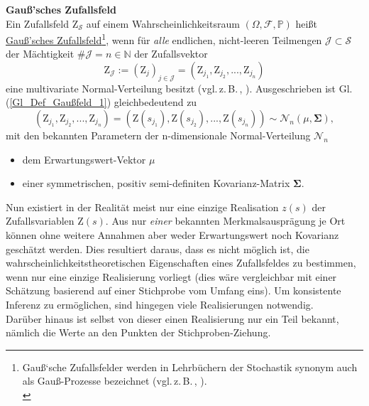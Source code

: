 \begin{definition} \textbf{Gauß'sches Zufallsfeld} \\
Ein Zufallsfeld  
$\mathrm{Z}_\mathcal{S}$ auf 
einem Wahrscheinlichkeitsraum $(\Omega, \mathcal{F}, \mathbb{P})$ heißt
\underline{Gauß'sches Zufallsfeld}\footnote{Gauß`sche Zufallsfelder werden 
in Lehrbüchern der Stochastik synonym auch als Gauß-Prozesse bezeichnet 
(vgl.\,z.\,B.\,\cite[S.\,462]{Schmidt2011}, 
\cite[S.\,344]{Meintrup2005}).\\}, 
wenn für \textit{alle} endlichen, 
nicht-leeren Teilmengen $\mathcal{J} \subset \mathcal{S}$ der Mächtigkeit 
$\#\mathcal{J} = n \in \mathbb{N}$ der Zufallsvektor 
\begin{equation}
\label{Gl_Def_Gaußfeld_1}
\mathrm{Z}_\mathcal{J} :=\left( \mathrm{Z}_j\right)_{j \in \mathcal{J}}=
\left(\mathrm{Z}_{j_1}, \mathrm{Z}_{j_2}, ..., \mathrm{Z}_{j_n}\right) 
\end{equation}
eine multivariate Normal-Verteilung besitzt 
(vgl.\,z.\,B.\,\cite[S.\,46f]{Diggle2007}, \cite[S.\,13]{Montero2015}).
Ausgeschrieben ist Gl.\,(\ref{Gl_Def_Gaußfeld_1}) gleichbedeutend zu
\begin{equation}
\label{Gl_Def_Gaußfeld_2}
\left(\mathrm{Z}_{j_1}, \mathrm{Z}_{j_2}, ..., \mathrm{Z}_{j_n}\right) =
\left(\mathrm{Z}(s_{j_1}), \mathrm{Z}(s_{j_2}), ..., 
\mathrm{Z}(s_{j_n})\right) \sim
\mathcal{N}_n\left(\mu, \mathbf{\Sigma}\right),
\end{equation}
mit den bekannten Parametern der n-dimensionale Normal-Verteilung
$\mathcal{N}_n$
\begin{itemize}[topsep=2pt,parsep=1pt,itemsep=0.5pt]
\item[$\circ$] dem Erwartungswert-Vektor $\mu$
\item[$\circ$] einer symmetrischen, positiv semi-definiten 
Kovarianz-Matrix $\mathbf{\Sigma}$.
\end{itemize}
\end{definition}  

Nun existiert in der Realität meist nur eine einzige Realisation 
$z(s)$ der Zufallsvariablen $\mathrm{Z}(s)$. Aus nur \textit{einer}
bekannten Merkmalsausprägung je Ort können ohne weitere
 Annahmen aber weder Erwartungswert noch Kovarianz geschätzt 
werden. Dies resultiert daraus, dass es nicht möglich ist, die
wahrscheinlichkeitstheoretischen Eigenschaften
eines Zufallsfeldes zu bestimmen, wenn nur eine einzige
Realisierung vorliegt (dies wäre vergleichbar mit einer 
Schätzung basierend auf einer Stichprobe vom Umfang eins).
Um konsistente Inferenz zu ermöglichen, sind hingegen viele
Realisierungen notwendig.\\
Darüber hinaus ist selbst von dieser einen Realisierung nur ein Teil
bekannt, nämlich die Werte an den Punkten der Stichproben-Ziehung.\\

